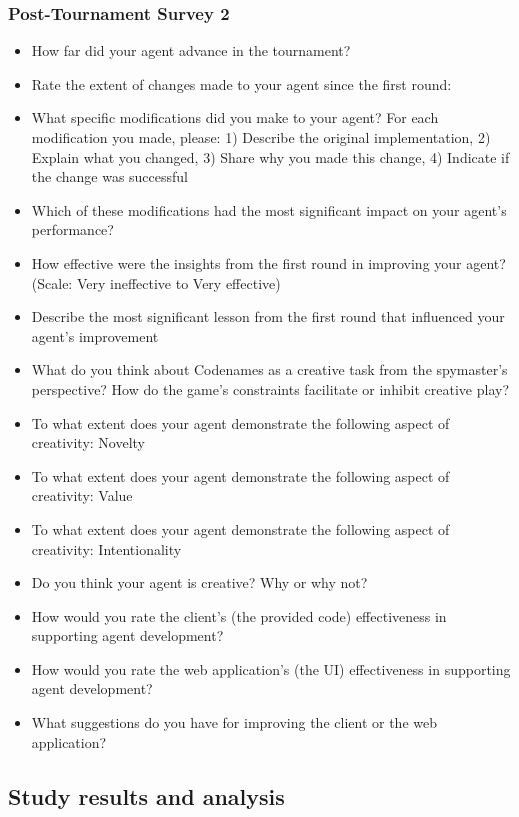 \documentclass[phd,electronic,oneside,twosidetoc,letterpaper,chaptercenter,parttop,lof]{byumsphd}
\begin{document}
\subsubsection{Post-Tournament Survey 2}
\begin{itemize}
    \item How far did your agent advance in the tournament?
    \item Rate the extent of changes made to your agent since the first round:\textdagger
    \item What specific modifications did you make to your agent? For each modification you made, please: 1) Describe the original implementation, 2) Explain what you changed, 3) Share why you made this change, 4) Indicate if the change was successful
    \item Which of these modifications had the most significant impact on your agent's performance?
    \item How effective were the insights from the first round in improving your agent? (Scale: Very ineffective to Very effective)\textdagger
    \item Describe the most significant lesson from the first round that influenced your agent's improvement
    \item What do you think about Codenames as a creative task from the spymaster's perspective? How do the game's constraints facilitate or inhibit creative play?
    \item To what extent does your agent demonstrate the following aspect of creativity: Novelty\textdagger
    \item To what extent does your agent demonstrate the following aspect of creativity: Value\textdagger
    \item To what extent does your agent demonstrate the following aspect of creativity: Intentionality\textdagger
    \item Do you think your agent is creative? Why or why not?
    \item How would you rate the client's (the provided code) effectiveness in supporting agent development?\textdagger
    \item How would you rate the web application's (the UI) effectiveness in supporting agent development?\textdagger
    \item What suggestions do you have for improving the client or the web application?
\end{itemize}


\subsection{Study results and analysis}
\end{document}
